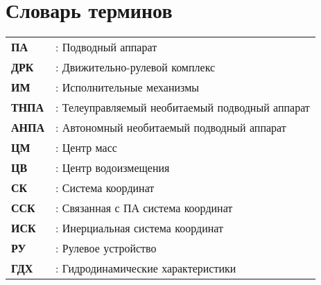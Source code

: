 \chapter*{Словарь терминов}             %

\begin{table*}[ht!]
    \begin{tabular}{ll}
		\textbf{ПА} &: Подводный аппарат \\

		\textbf{ДРК} &: Движительно-рулевой комплекс \\

		\textbf{ИМ} &: Исполнительные механизмы \\

		\textbf{ТНПА} &: Телеуправляемый необитаемый подводный аппарат \\

		\textbf{АНПА} &: Автономный необитаемый подводный аппарат \\

		\textbf{ЦМ} &: Центр масс \\

		\textbf{ЦВ} &: Центр водоизмещения \\

		\textbf{СК} &: Система координат \\

		\textbf{ССК} &: Связанная с ПА система координат \\

		\textbf{ИСК} &: Инерциальная система координат \\

		\textbf{РУ} &: Рулевое устройство \\

		\textbf{ГДХ} &: Гидродинамические характеристики \\
    \end{tabular}
\end{table*}

